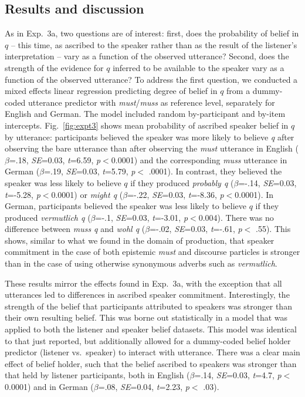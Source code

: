 \documentclass[11pt]{article}
\begin{document}
\subsection{Results and discussion}

As in Exp.~3a, two questions are of interest: first, does the probability of  belief in $q$ -- this time, as ascribed to the speaker rather than as the result of the listener's interpretation --  vary as a function of the observed utterance? Second, does the strength of the evidence for $q$ inferred to be available to the speaker vary as a function of the observed utterance? To address the first question, we conducted a mixed effects linear regression predicting degree of belief in $q$ from a dummy-coded utterance predictor with \emph{must}/\emph{muss} as reference level, separately for English and German. The model included random by-participant and by-item intercepts. Fig.~\ref{fig:expt3} shows mean probability of ascribed speaker belief in $q$ by utterance: participants believed the speaker was more likely to believe \emph{q}  after observing the bare utterance than after observing the \emph{must} utterance in English   ($\beta$=.18, \emph{SE}=0.03, \emph{t}=6.59, \emph{p}$<$0.0001) and the corresponding \emph{muss} utterance in German ($\beta$=.19, \emph{SE}=0.03, \emph{t}=5.79, \emph{p}$<$ .0001). In contrast, they believed the speaker was less likely to believe $q$ if they produced \emph{probably q} ($\beta$=-.14, \emph{SE}=0.03, \emph{t}=-5.28, \emph{p}$<$0.0001) or \emph{might q} ($\beta$=-.22, \emph{SE}=0.03, \emph{t}=-8.36, \emph{p}$<$0.0001). In German, participants believed the speaker was less likely to believe $q$ if they produced \emph{vermutlich q} ($\beta$=-.1, \emph{SE}=0.03, \emph{t}=-3.01, \emph{p}$<$0.004). There was no difference between \emph{muss q} and \emph{wohl q} ($\beta$=-.02, \emph{SE}=0.03, \emph{t}=-.61, \emph{p}$<$ .55).  This shows, similar to what we found in the domain of production, that speaker commitment in the case of both epistemic \emph{must} and discourse particles is stronger than in the case of using otherwise synonymous adverbs such as \emph{vermutlich}.

These results mirror the effects found in Exp.~3a, with the exception that all utterances led to differences in ascribed speaker commitment. Interestingly, the strength of the belief that participants attributed to speakers was stronger than their own resulting belief. This was borne out statistically in a model that was applied to both the listener and speaker belief datasets. This model was identical to that just reported, but additionally allowed for a dummy-coded belief holder predictor (listener vs.~speaker)  to interact with utterance. There was a clear main effect of belief holder, such that the belief ascribed to speakers was stronger than that held by listener participants, both in English ($\beta$=.14, \emph{SE}=0.03, \emph{t}=4.7, \emph{p}$<$0.0001) and in German ($\beta$=.08, \emph{SE}=0.04, \emph{t}=2.23, \emph{p}$<$ .03). 
\end{document}

